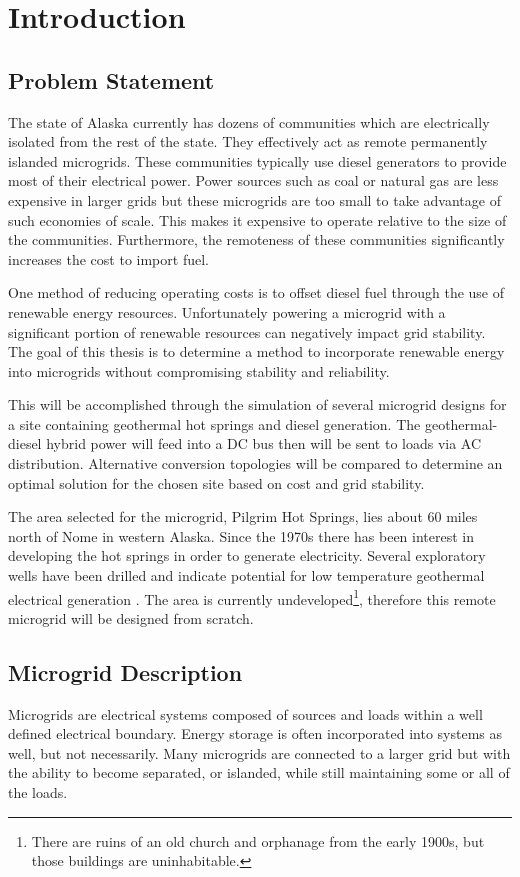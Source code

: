 \chapter{Introduction}

\section{Problem Statement}
The state of Alaska currently has dozens of communities which are electrically isolated from the rest of the state. They effectively act as remote permanently islanded microgrids. These communities typically use diesel generators to provide most of their electrical power. Power sources such as coal or natural gas are less expensive in larger grids but these microgrids are too small to take advantage of such economies of scale. This makes it expensive to operate relative to the size of the communities. Furthermore, the remoteness of these communities significantly increases the cost to import fuel.

One method of reducing operating costs is to offset diesel fuel through the use of renewable energy resources. Unfortunately powering a microgrid with a significant portion of renewable resources can negatively impact grid stability. The goal of this thesis is to determine a method to incorporate renewable energy into microgrids without compromising stability and reliability. 

This will be accomplished through the simulation of several microgrid designs for a site containing geothermal hot springs and diesel generation. The geothermal-diesel hybrid power will feed into a DC bus then will be sent to loads via AC distribution. Alternative conversion topologies will be compared to determine an optimal solution for the chosen site based on cost and grid stability.

The area selected for the microgrid, Pilgrim Hot Springs, lies about 60 miles north of Nome in western Alaska. Since the 1970s there has been interest in developing the hot springs in order to generate electricity. Several exploratory wells have been drilled and indicate potential for low temperature geothermal electrical generation \cite{Holdmann2013}. The area is currently undeveloped\footnote{There are ruins of an old church and orphanage from the early 1900s, but those buildings are uninhabitable.}, therefore this remote microgrid will be designed from scratch.

\section{Microgrid Description}
Microgrids are electrical systems composed of sources and loads within a well defined electrical boundary. Energy storage is often incorporated into systems as well, but not necessarily. Many microgrids are connected to a larger grid but with the ability to become separated, or islanded, while still maintaining some or all of the loads. 

